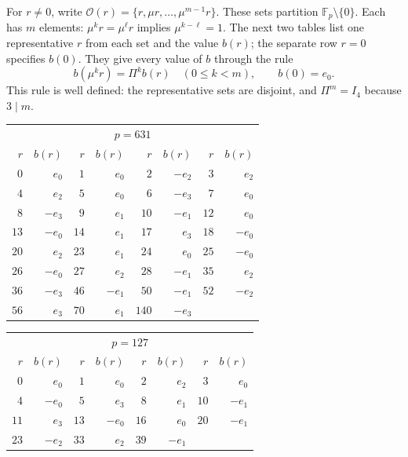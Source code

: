 \documentclass[10pt]{article}
\newcommand{\F}{\mathbb F}
\begin{document}
For $r\ne0$, write
$\mathcal O(r)=\{r,\mu r,\ldots,\mu^{m-1}r\}$.
These sets partition $\F_p\setminus\{0\}$. Each has $m$ elements:
$\mu^kr=\mu^\ell r$ implies $\mu^{k-\ell}=1$.
The next two tables list one representative $r$ from each set and the
value $b(r)$; the separate row $r=0$ specifies $b(0)$.
They give every value of $b$ through the rule
\begin{equation}\label{eq:b-extension}
 b(\mu^k r)=\Pi^k b(r)\quad(0\leq k<m),\qquad b(0)=e_0.
\end{equation}
This rule is well defined: the representative sets are disjoint, and
$\Pi^m=I_4$ because $3\mid m$.

\begin{center}\small
\begin{tabular}{rr@{\quad}rr@{\quad}rr@{\quad}rr}
\multicolumn{8}{c}{$p=631$}\\
$r$&$b(r)$&$r$&$b(r)$&$r$&$b(r)$&$r$&$b(r)$\\\hline
$0$&$e_{0}$&$1$&$e_{0}$&$2$&$-e_{2}$&$3$&$e_{2}$\\
$4$&$e_{2}$&$5$&$e_{0}$&$6$&$-e_{3}$&$7$&$e_{0}$\\
$8$&$-e_{3}$&$9$&$e_{1}$&$10$&$-e_{1}$&$12$&$e_{0}$\\
$13$&$-e_{0}$&$14$&$e_{1}$&$17$&$e_{3}$&$18$&$-e_{0}$\\
$20$&$e_{2}$&$23$&$e_{1}$&$24$&$e_{0}$&$25$&$-e_{0}$\\
$26$&$-e_{0}$&$27$&$e_{2}$&$28$&$-e_{1}$&$35$&$e_{2}$\\
$36$&$-e_{3}$&$46$&$-e_{1}$&$50$&$-e_{1}$&$52$&$-e_{2}$\\
$56$&$e_{3}$&$70$&$e_{1}$&$140$&$-e_{3}$&&\\
\end{tabular}\end{center}

\begin{center}\small
\begin{tabular}{rr@{\quad}rr@{\quad}rr@{\quad}rr}
\multicolumn{8}{c}{$p=127$}\\
$r$&$b(r)$&$r$&$b(r)$&$r$&$b(r)$&$r$&$b(r)$\\\hline
$0$&$e_{0}$&$1$&$e_{0}$&$2$&$e_{2}$&$3$&$e_{0}$\\
$4$&$-e_{0}$&$5$&$e_{3}$&$8$&$e_{1}$&$10$&$-e_{1}$\\
$11$&$e_{3}$&$13$&$-e_{0}$&$16$&$e_{0}$&$20$&$-e_{1}$\\
$23$&$-e_{2}$&$33$&$e_{2}$&$39$&$-e_{1}$&&\\
\end{tabular}\end{center}
\end{document}
